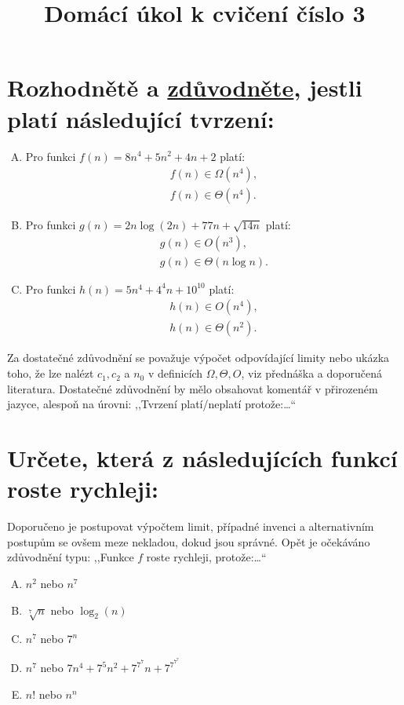 \documentclass[12pt,oneside]{article}
\title{Domácí úkol k cvičení číslo 3}
\author{\vspace{-1em}}
\begin{document}
	\maketitle
	\section{Rozhodnětě a \underline{zdůvodněte}, jestli platí následující tvrzení:}
	\begin{enumerate}[A)]
		\item Pro funkci $f(n) = 8n^4 + 5n^2 + 4n + 2$ platí:
		\begin{align}
			f(n) \in \Omega(n^4), \\
			f(n) \in \Theta(n^4).
		\end{align}
		\vspace{2cm}
		\item Pro funkci $g(n) = 2n\log(2n) + 77n + \sqrt{14n}$ platí:
		\begin{align}
			g(n) \in O(n^3), \\
			g(n) \in \Theta(n\log n).
		\end{align}
		\vspace{2cm}
		\item Pro funkci $h(n) = 5n^4 + 4^4n + 10^{10} $ platí:
		\begin{align}
			h(n) \in O(n^4) ,\\
			h(n) \in \Theta(n^2).
		\end{align}
	\end{enumerate}
	\vspace{2cm}
	Za dostatečné zdůvodnění se považuje výpočet odpovídající limity nebo ukázka toho, že lze nalézt $c_1, c_2$ a $n_0$ v definicích $\Omega, \Theta, O$, viz přednáška a doporučená literatura.
	Dostatečné zdůvodnění by mělo obsahovat komentář v přirozeném jazyce, alespoň na úrovni: ,,Tvrzení platí/neplatí protože:\dots``

	\section{Určete, která z následujících funkcí roste rychleji:}
	Doporučeno je postupovat výpočtem limit, případné invenci a alternativním postupům se ovšem meze nekladou, dokud jsou správné.
	Opět je očekáváno zdůvodnění typu: ,,Funkce $f$ roste rychleji, protože:\dots``
	\begin{enumerate}[A), itemsep=2.5em]
		\item $n^2$ nebo $n^7$
		\item $\sqrt[7]{n}$ nebo $\log_2(n)$
		\item $n^{7}$ nebo $7^n$
		\item $n^7$ nebo $7n^4 + 7^5n^2 + 7^{7^7}n + 7^{7^{7^7}}$
		\item $n!$ nebo $n^n$
	\end{enumerate}
	\vspace{2.5em}
\end{document}
